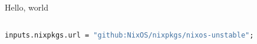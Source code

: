 \documentclass{article}
\begin{document}
\usepackage{lstlisting,color}

Hello, world

\begin{lstlisting}[language=nix, caption=My Python Code]

inputs.nixpkgs.url = "github:NixOS/nixpkgs/nixos-unstable";

\end{lstlisting}
\end{document}
